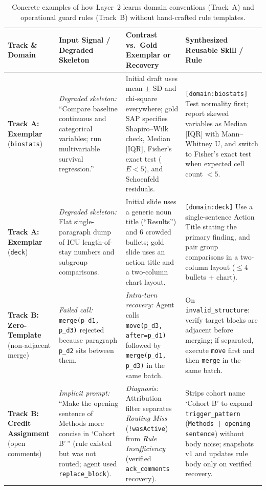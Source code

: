 \documentclass[11pt,a4paper]{article}
\begin{document}
\begin{table}[!t]
\centering
\caption{Concrete examples of how Layer~2 learns domain conventions (Track~A) and operational guard rules (Track~B) without hand-crafted rule templates.}
\label{tab:evolution_examples}
\vspace{2pt}
\small
\setlength{\tabcolsep}{4.5pt}
\begin{tabularx}{\textwidth}{@{}>{\raggedright\arraybackslash}p{2.9cm}>{\raggedright\arraybackslash}X>{\raggedright\arraybackslash}X>{\raggedright\arraybackslash}X@{}}
\toprule
\textbf{Track \& Domain} & \textbf{Input Signal / Degraded Skeleton} & \textbf{Contrast vs.\ Gold Exemplar or Recovery} & \textbf{Synthesized Reusable Skill / Rule} \\
\midrule
\textbf{Track A: Exemplar} (\texttt{biostats}) & \emph{Degraded skeleton:} ``Compare baseline continuous and categorical variables; run multivariable survival regression.'' & Initial draft uses mean $\pm$ SD and chi-square everywhere; gold SAP specifies Shapiro--Wilk check, Median [IQR], Fisher's exact test ($E<5$), and Schoenfeld residuals. & \texttt{[domain:biostats]} Test normality first; report skewed variables as Median [IQR] with Mann--Whitney U, and switch to Fisher's exact test when expected cell count $<5$. \\
\addlinespace[4pt]
\textbf{Track A: Exemplar} (\texttt{deck}) & \emph{Degraded skeleton:} Flat single-paragraph dump of ICU length-of-stay numbers and subgroup comparisons. & Initial slide uses a generic noun title (``Results'') and 6 crowded bullets; gold slide uses an action title and a two-column chart layout. & \texttt{[domain:deck]} Use a single-sentence Action Title stating the primary finding, and pair group comparisons in a two-column layout ($\le 4$ bullets + chart). \\
\addlinespace[4pt]
\textbf{Track B: Zero-Template} (non-adjacent merge) & \emph{Failed call:} \texttt{merge(p\_d1, p\_d3)} rejected because paragraph \texttt{p\_d2} sits between them. & \emph{Intra-turn recovery:} Agent calls \texttt{move(p\_d3, after=p\_d1)} followed by \texttt{merge(p\_d1, p\_d3)} in the same batch. & On \texttt{invalid\_structure}: verify target blocks are adjacent before merging; if separated, execute \texttt{move} first and then \texttt{merge} in the same batch. \\
\addlinespace[4pt]
\textbf{Track B: Credit Assignment} (open comments) & \emph{Implicit prompt:} ``Make the opening sentence of Methods more concise in `Cohort B'\,'' (rule existed but was not routed; agent used \texttt{replace\_block}). & \emph{Diagnosis:} Attribution filter separates \emph{Routing Miss} (\texttt{!wasActive}) from \emph{Rule Insufficiency} (verified \texttt{ack\_comments} recovery). & Strips cohort name `Cohort B' to expand \texttt{trigger\_pattern} (\texttt{Methods | opening sentence}) without body noise; snapshots v1 and updates rule body only on verified recovery. \\
\bottomrule
\end{tabularx}
\end{table}
\end{document}

